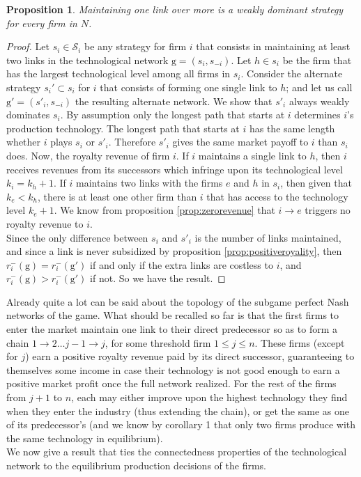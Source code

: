 \documentclass{article}
\newtheorem{proposition}{Proposition}
\begin{document}
\begin{proposition}\label{prop:onelink}
Maintaining one link over more is a weakly dominant strategy for every firm in $N$. 
\end{proposition}
\begin{proof}
Let $s_i\in \mathcal{S}_i$ be any strategy for firm $i$ that consists in maintaining at least two links in the technological network $\text{g}=(s_i,s_{-i})$. Let $h\in s_i$ be the firm that has the largest technological level among all firms in $s_i$. Consider the alternate strategy $s_i'\subset s_i$  for $i$ that consists of forming one single link to $h$; and let us call $\text{g}'=(s'_i,s_{-i})$ the resulting alternate network. We show that $s'_i$ always weakly dominates $s_i$. By assumption only the longest path that starts at $i$ determines $i$'s production technology. The longest path that starts at $i$ has the same length whether $i$ plays $s_i$ or $s'_i$. Therefore $s'_i$ gives the same market payoff to $i$ than $s_i$ does.
Now, the royalty revenue of firm $i$. If $i$ maintains a single link to $h$, then $i$ receives revenues from its successors which infringe upon its technological level $k_i=k_h+1$. If $i$ maintains two links with the firms $e$ and $h$ in $s_i$, then given that $k_e<k_h$, there is at least one other firm than $i$ that has access to the technology level $k_e+1$. We know from proposition \ref{prop:zerorevenue} that $i\rightarrow e$ triggers no royalty revenue to $i$. \\
Since the only difference between $s_i$ and $s'_i$ is the number of links maintained, and since a link is never subsidized by proposition \ref{prop:positiveroyality}, then $r_i^-(\text{g}) = {r}_i^{-}(\text{g}')$ if and only if the extra links are costless to $i$, and $r_i^-(\text{g}) > {r}_i^{-}(\text{g}')$ if not. So we have the result. 
\end{proof}
Already quite a lot can be said about the topology of the subgame perfect Nash networks of the game. What should be recalled so far is that the first firms to enter the market maintain one link to their direct predecessor so as to form a chain $1\rightarrow 2 \ldots j-1 \rightarrow j$, for some threshold firm $1\leq j\leq n$. These firms (except for $j$) earn a positive royalty revenue paid by its direct successor, guaranteeing to themselves some income in case their technology is not good enough to earn a positive market profit once the full network realized. For the rest of the firms from $j+1$ to $n$, each may either improve upon the highest technology they find when they enter the industry (thus extending the chain), or get the same as one of its predecessor's (and we know by corollary 1 that only two firms produce with the same technology in equilibrium).\\
\indent We now give a result that ties the connectedness properties of the technological network to the equilibrium production decisions of the firms. \\
 
\end{document}
